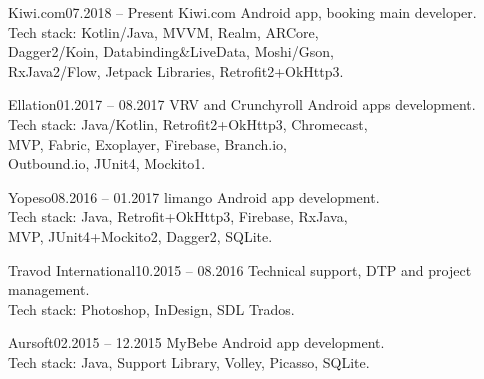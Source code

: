 \documentclass[12pt, a4paper]{article}
\begin{document}
\begin{minipage}[t]{0.6\textwidth}
    
    \begin{subsec}{Kiwi.com}{07.2018 – Present}
        \> Kiwi.com Android app, booking main developer. \\
        \> Tech stack: Kotlin/Java, MVVM, Realm, ARCore, \\
        \> Dagger2/Koin, Databinding\&LiveData, Moshi/Gson, \\
        \> RxJava2/Flow, Jetpack Libraries, Retrofit2+OkHttp3. \\
    \end{subsec}
    
    \begin{subsec}{Ellation}{01.2017 – 08.2017}
        \> VRV and Crunchyroll Android apps development. \\
        \> Tech stack: Java/Kotlin, Retrofit2+OkHttp3, Chromecast, \\
        \> MVP, Fabric, Exoplayer, Firebase, Branch.io, \\
        \> Outbound.io, JUnit4, Mockito1. \\
    \end{subsec}
    
    \begin{subsec}{Yopeso}{08.2016 – 01.2017}
        \> limango Android app development. \\
        \> Tech stack: Java, Retrofit+OkHttp3, Firebase, RxJava, \\
        \> MVP, JUnit4+Mockito2, Dagger2, SQLite. \\
    \end{subsec}
    
    \begin{subsec}{Travod International}{10.2015 – 08.2016}
        \> Technical support, DTP and project management. \\
        \> Tech stack: Photoshop, InDesign, SDL Trados. \\
    \end{subsec}
     
    \begin{subsec}{Aursoft}{02.2015 – 12.2015}
        \> MyBebe Android app development. \\
        \> Tech stack: Java, Support Library, Volley, Picasso, SQLite. \\
    \end{subsec}
    

\end{minipage}
\end{document}
